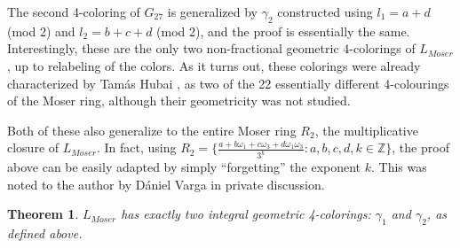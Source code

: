 \documentclass{article}
\newtheorem{theorem}{Theorem}[section]
\begin{document}
The second 4-coloring of $G_{27}$ is generalized by $\gamma_2$ constructed using $l_1 = a+d$ (mod 2) and $l_2 = b + c + d$ (mod 2), and the proof is essentially the same. Interestingly, these are the only two non-fractional geometric 4-colorings of $L_{Moser}$, up to relabeling of the colors. As it turns out, these colorings were already characterized by Tamás Hubai \cite{hubai}, as two of the 22 essentially different 4-colourings of the Moser ring, although their geometricity was not studied.

Both of these also generalize to the entire Moser ring $R_2$, the multiplicative closure of $L_{Moser}$. In fact, using $R_2 = \{\frac{a + b\omega_1 + c\omega_3 + d\omega_1\omega_3}{3^k} : a,b,c,d,k\in\mathbb{Z}\}$, the proof above can be easily adapted by simply ``forgetting'' the exponent $k$. This was noted to the author by Dániel Varga in private discussion.

\begin{theorem}
    $L_{Moser}$ has exactly two integral geometric 4-colorings: $\gamma_1$ and $\gamma_2$, as defined above.
\end{theorem}
\end{document}

